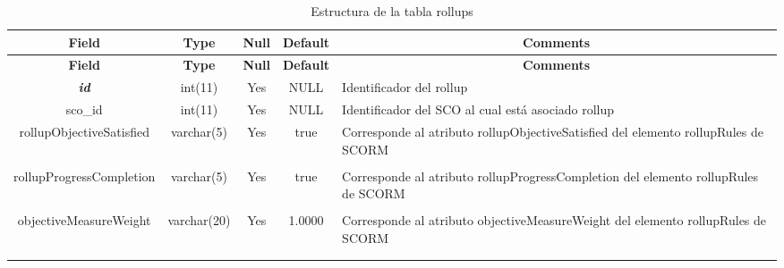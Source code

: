 %
%
\begin{longtable}{c c c c l}
	\multicolumn{1}{c}{\textbf{Field}} &
	\multicolumn{1}{c}{\textbf{Type}} &
	\multicolumn{1}{c}{\textbf{Null}} &
	\multicolumn{1}{c}{\textbf{Default}} &
	\multicolumn{1}{c}{\textbf{Comments}} \\ \hline \hline
\endfirsthead
	\multicolumn{1}{c}{\textbf{Field}} &
	\multicolumn{1}{c}{\textbf{Type}} &
	\multicolumn{1}{c}{\textbf{Null}} &
	\multicolumn{1}{c}{\textbf{Default}} &
	\multicolumn{1}{c}{\textbf{Comments}} \\ \hline \hline
\endhead \endfoot
	\textbf{\textit{id}} & int(11) & Yes & NULL & \parbox[t]{0.35\textwidth}{Identificador del rollup}\\ \hline 
	sco\_id & int(11) & Yes & NULL & \parbox[t]{0.35\textwidth}{Identificador del SCO al cual está asociado rollup}\\ \hline 
	rollupObjectiveSatisfied & varchar(5) & Yes & true & \parbox[t]{0.35\textwidth}{Corresponde al atributo rollupObjectiveSatisfied del elemento rollupRules de SCORM} \\ \\  \hline
	rollupProgressCompletion & varchar(5) & Yes & true & \parbox[t]{0.35\textwidth}{Corresponde al atributo rollupProgressCompletion del elemento rollupRules de SCORM} \\ \\  \hline
	objectiveMeasureWeight & varchar(20) & Yes & 1.0000 & \parbox[t]{0.35\textwidth}{Corresponde al atributo objectiveMeasureWeight del elemento rollupRules de SCORM} \\ \\  \hline
 \caption{Estructura de la tabla rollups} \label{tab:scorm_rollups-structure} \\
\end{longtable}

